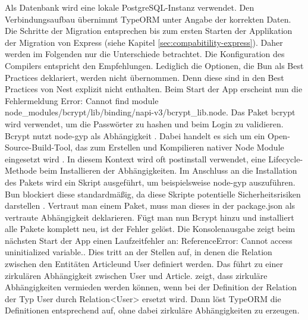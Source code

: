 \noindent
Als Datenbank wird eine lokale PostgreSQL-Instanz verwendet. Den Verbindungsaufbau übernimmt TypeORM unter Angabe der korrekten Daten. Die Schritte der Migration entsprechen bis zum ersten Starten der Applikation der Migration von Express (siehe Kapitel \ref{sec:compabitility-express}). Daher werden im Folgenden nur die Unterschiede betrachtet. Die Konfiguration des Compilers entspricht den Empfehlungen. Lediglich die Optionen, die Bun als Best Practices deklariert, werden nicht übernommen. Denn diese sind in den Best Practices von Nest explizit nicht enthalten. \newline
Beim Start der App erscheint nun die Fehlermeldung \glqq Error: Cannot find module node\_modules/bcrypt/lib/binding/napi-v3/bcrypt\_lib.node\grqq{}. Das Paket \glqq bcrypt\grqq{} wird verwendet, um die Passwörter zu hashen und beim Login zu validieren. Bcrypt nutzt node-gyp als Abhängigkeit \cite{DelGobbo.2018}. Dabei handelt es sich um ein Open-Source-Build-Tool, das zum Erstellen und Kompilieren nativer Node Module eingesetzt wird \cite{OpenJSFoundation.o.J.b}. In diesem Kontext wird oft \glqq postinstall\grqq{} verwendet, eine Lifecycle-Methode beim Installieren der Abhängigkeiten. Im Anschluss an die Installation des Pakets wird ein Skript ausgeführt, um beispielsweise node-gyp auszuführen. Bun blockiert diese standardmäßig, da diese Skripte potentielle Sicherheitsrisiken darstellen \cite{OvenSh.2023}. Vertraut man einem Paket, muss man dieses in der \glqq package.json\grqq{} als vertraute Abhängigkeit deklarieren. Fügt man nun Bcrypt hinzu und installiert alle Pakete komplett neu, ist der Fehler gelöst. \newline
Die Konsolenausgabe zeigt beim nächsten Start der App einen Laufzeitfehler an: \glqq ReferenceError: Cannot access uninitialized variable.\grqq{}. Dies tritt an der Stellen auf, in denen die Relation zwischen den Entitäten \glqq Article\grqq{}und \glqq User\grqq{} definiert werden. Das führt zu einer zirkulären Abhängigkeit zwischen \glqq User\grqq{} und \glqq Article\grqq{}. \cite{TypeORM.} zeigt, dass zirkuläre Abhängigkeiten vermieden werden können, wenn bei der Definition der Relation der Typ \glqq User\grqq{} durch \glqq Relation<User>\grqq{} ersetzt wird. Dann löst TypeORM die Definitionen entsprechend auf, ohne dabei zirkuläre Abhängigkeiten zu erzeugen.\\

